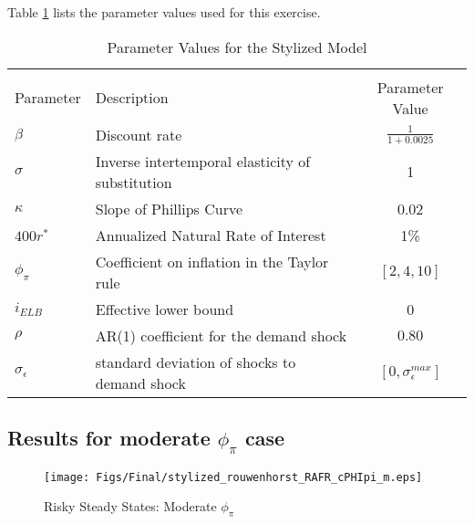 \documentclass[11pt]{article}
\begin{document}
	Table \ref{tab:ParameterValues_AR1} lists the parameter values used for this exercise. 
	\begin{table}[!h]
		{\small
			\begin{center}
				\caption{Parameter Values for the Stylized Model\label{tab:ParameterValues_AR1}}
				\vspace{-1.5em}
				\begin{tabular}{llc}
					\multicolumn{3}{c}{}\\
					Parameter & Description  & Parameter Value  \\
					\hline
					\hline
					$\beta$ & Discount rate & $\frac{1}{1+0.0025}$ \\
					$\sigma$ & Inverse intertemporal elasticity of substitution  & 1\\
					$\kappa$ & Slope of Phillips Curve & 0.02 \\
					$400r^*$ & Annualized Natural Rate of Interest & 1\%\\
					$\phi_{\pi}$ & Coefficient on inflation in the Taylor rule & $[2, 4, 10]$\\
					$i_{ELB}$    & Effective lower bound & 0\\
					\hline
					$\rho$ & AR(1) coefficient for the demand shock & $0.80$ \\
					$\sigma_{\epsilon}$ & standard deviation of shocks to demand shock & $[0, \sigma_{\epsilon}^{max}]$ \\
					\hline
					\hline
				\end{tabular}
			\end{center}
		}
		\vspace{-0.5em}
	\end{table}
	
	\subsection{Results for moderate $\phi_{\pi}$ case}	
	
	\begin{figure}[h]  %
		\begin{center}
			\caption{Risky Steady States: Moderate $\phi_{\pi}$}
			\texttt{[image: Figs/Final/stylized\_rouwenhorst\_RAFR\_cPHIpi\_m.eps]}
			\label{fig:RAFR_nar1_moderate_cPHIpi}
		\end{center}
	\end{figure}
	
\end{document}
